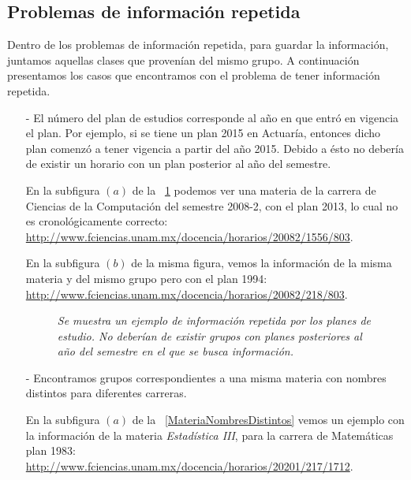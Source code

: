 \subsection{Problemas de información repetida}

Dentro de los problemas de información repetida, para guardar la información, juntamos aquellas clases que provenían del mismo grupo. A continuación presentamos los casos que encontramos con el problema de tener información repetida.

\begin{itemize}
\item[-] El número del plan de estudios corresponde al año en que entró en vigencia el plan. Por ejemplo, si se tiene un plan 2015 en Actuaría, entonces dicho plan comenzó a tener vigencia a partir del año 2015. Debido a ésto no debería de existir un horario con un plan posterior al año del semestre.

En la subfigura $(a)$ de la \figurename{~\ref{planRepetido}} podemos ver una materia de la carrera de Ciencias de la Computación del semestre 2008-2, con el plan 2013, lo cual no es cronológicamente correcto: \url{http://www.fciencias.unam.mx/docencia/horarios/20082/1556/803}.

En la subfigura $(b)$ de la misma figura, vemos la información de la misma materia y del mismo grupo pero con el plan 1994: \url{http://www.fciencias.unam.mx/docencia/horarios/20082/218/803}.

\begin{figure}[H]
\centering
{} %
	\caption[\textit{Ejemplo de información repetida: Planes de estudio}]{\textit{Se muestra un ejemplo de información repetida por los planes de estudio. No deberían de existir grupos con planes posteriores al año del semestre en el que se busca información.}}\label{planRepetido}
\end{figure}

\item[-] Encontramos grupos correspondientes a una misma materia con nombres distintos para diferentes carreras.

En la subfigura $(a)$ de la \figurename{~\ref{MateriaNombresDistintos}} vemos un ejemplo con la información de la materia \textit{Estadística III}, para la carrera de Matemáticas plan 1983: \url{http://www.fciencias.unam.mx/docencia/horarios/20201/217/1712}.


\end{itemize}
